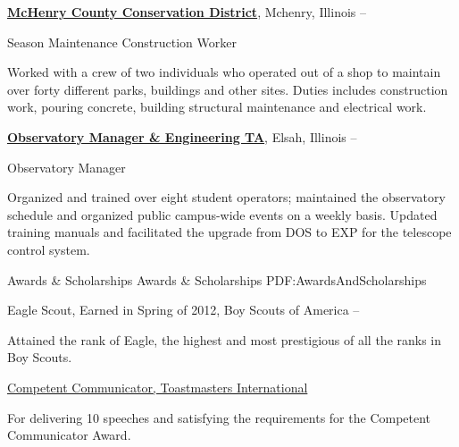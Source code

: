 \documentclass[a4paper,MMMyyyy,nonstopmode]{simpleresumecv}
\begin{document}
\begin{Body}

\href{http://www.mccdistrict.org/rccms/}
{\textbf{
McHenry County Conservation District}},
Mchenry, Illinois
\hfill {} --

\Gap
\BulletItem
Season Maintenance Construction Worker
\begin{Detail}
\SubBulletItem
Worked with a crew of two individuals who operated out of a shop to maintain over forty different parks, buildings and other sites. Duties includes construction work, pouring concrete, building structural maintenance and electrical work.
\end{Detail}


\href{http://www.mccdistrict.org/rccms/}
{\textbf{Observatory Manager \& Engineering TA}},
Elsah, Illinois
\hfill
{} --

\Gap
\BulletItem
Observatory Manager

\begin{Detail}
\SubBulletItem
Organized and trained over eight student operators; maintained the observatory schedule and organized public campus-wide events on a weekly basis.
\SubBulletItem
Updated training manuals and facilitated the upgrade from DOS to EXP for the telescope control system.
\end{Detail}


\Section
{Awards \&\newline
Scholarships}
{Awards \& Scholarships}
{PDF:AwardsAndScholarships}

\BulletItem
Eagle Scout,
Earned in Spring of 2012,
Boy Scouts of America
\hfill
{} --
\begin{Detail}
\Item
Attained the rank of Eagle, the highest and most prestigious of all the ranks in Boy Scouts.
\end{Detail}

\Gap
\BulletItem
\href{https://www.toastmasters.org/Education/Communication-Track}{Competent Communicator,
Toastmasters International}
\hfill
{}
\begin{Detail}
\Item
For delivering 10 speeches and satisfying the requirements for the Competent Communicator Award. 
\end{Detail}


\end{Body}
\end{document}
